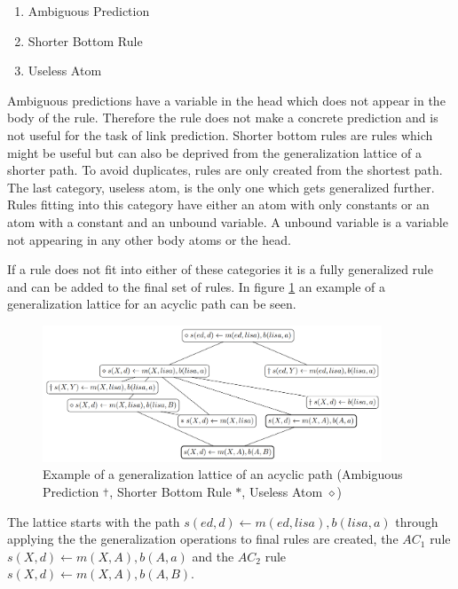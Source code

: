 \begin{enumerate}
\item Ambiguous Prediction
\item Shorter Bottom Rule
\item Useless Atom 
\end{enumerate}

Ambiguous predictions have a variable in the head which does not appear in the body of the rule. Therefore the rule does not make a concrete prediction and is not useful for the task of link prediction. Shorter bottom rules are rules which might be useful but can also be deprived from the generalization lattice of a shorter path. To avoid duplicates, rules are only created from the shortest path. The last category, useless atom, is the only one which gets generalized further. Rules fitting into this category have either an atom with only constants or an atom with a constant and an unbound variable. A unbound variable is a variable not appearing in any other body atoms or the head. 

If a rule does not fit into either of these categories it is a fully generalized rule and can be added to the final set of rules. In figure \ref{fig:generalization_lattice} an example of a generalization lattice for an acyclic path can be seen. \cite{meilicke_reinforced_2020}

\begin{figure}[H]
\centering
\includegraphics[width=0.9\textwidth]{images/example_generalization_lattice.png}
\caption{Example of a generalization lattice of an acyclic path (Ambiguous Prediction $\cross[.4pt]$, Shorter Bottom Rule $\ast$, Useless Atom $\diamond$)}
\label{fig:generalization_lattice}
\end{figure}

The lattice starts with the path $s(ed,d) \leftarrow m(ed,lisa), b(lisa,a)$ through applying the the generalization operations to final rules are created, the $AC_1$ rule $s(X,d) \leftarrow m(X,A),b(A,a)$ and the $AC_2$ rule $s(X,d) \leftarrow m(X,A),b(A,B)$.

